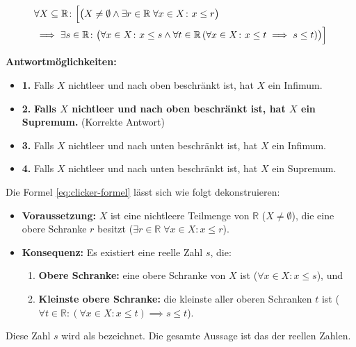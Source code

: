 \begin{math-stroke}
\begin{equation}
\label{eq:clicker-formel}
\begin{aligned}
    &\forall X \subseteq \mathbb{R} \colon \Bigl[ \bigl( X \neq \emptyset \land \exists r \in \mathbb{R} \; \forall x \in X \colon x \le r \bigr) \\
    &\implies \exists s \in \mathbb{R} \colon \bigl( \forall x \in X \colon x \le s \land \forall t \in \mathbb{R} \, (\forall x \in X \colon x \le t \implies s \le t) \bigr) \Bigr]
\end{aligned}
\end{equation}

\textbf{Antwortmöglichkeiten:}
\begin{itemize}
    \item \textbf{1.} Falls $X$ nichtleer und nach oben beschränkt ist, hat $X$ ein Infimum.
    \item \textbf{2.} \textbf{Falls $X$ nichtleer und nach oben beschränkt ist, hat $X$ ein Supremum.} (Korrekte Antwort)
    \item \textbf{3.} Falls $X$ nichtleer und nach unten beschränkt ist, hat $X$ ein Infimum.
    \item \textbf{4.} Falls $X$ nichtleer und nach unten beschränkt ist, hat $X$ ein Supremum.
\end{itemize}

\begin{explanation-of-steps}
Die Formel \eqref{eq:clicker-formel} lässt sich wie folgt dekonstruieren:
\begin{itemize}
    \item \textbf{Voraussetzung:} $X$ ist eine nichtleere Teilmenge von $\mathbb{R}$ ($X \neq \emptyset$), die eine obere Schranke $r$ besitzt ($\exists r \in \mathbb{R} \; \forall x \in X \colon x \le r$).
    \item \textbf{Konsequenz:} Es existiert eine reelle Zahl $s$, die:
    \begin{enumerate}[label=\textbf{(\arabic*)}]
        \item \textbf{Obere Schranke:} eine obere Schranke von $X$ ist ($\forall x \in X \colon x \le s$), und
        \item \textbf{Kleinste obere Schranke:} die kleinste aller oberen Schranken $t$ ist ($\forall t \in \mathbb{R} \colon (\forall x \in X \colon x \le t) \implies s \le t$).
    \end{enumerate}
\end{itemize}
Diese Zahl $s$ wird als  bezeichnet. Die gesamte Aussage ist das  der reellen Zahlen.
\end{explanation-of-steps}
\end{math-stroke}

